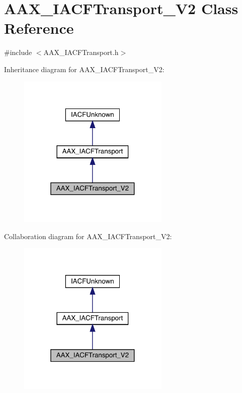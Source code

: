 \hypertarget{a01761}{}\section{A\+A\+X\+\_\+\+I\+A\+C\+F\+Transport\+\_\+\+V2 Class Reference}
\label{a01761}


{\ttfamily \#include $<$A\+A\+X\+\_\+\+I\+A\+C\+F\+Transport.\+h$>$}



Inheritance diagram for A\+A\+X\+\_\+\+I\+A\+C\+F\+Transport\+\_\+\+V2\+:
\nopagebreak
\begin{figure}[H]
\begin{center}
\leavevmode
\includegraphics[width=205pt]{a01760}
\end{center}
\end{figure}


Collaboration diagram for A\+A\+X\+\_\+\+I\+A\+C\+F\+Transport\+\_\+\+V2\+:
\nopagebreak
\begin{figure}[H]
\begin{center}
\leavevmode
\includegraphics[width=205pt]{a01759}
\end{center}
\end{figure}


